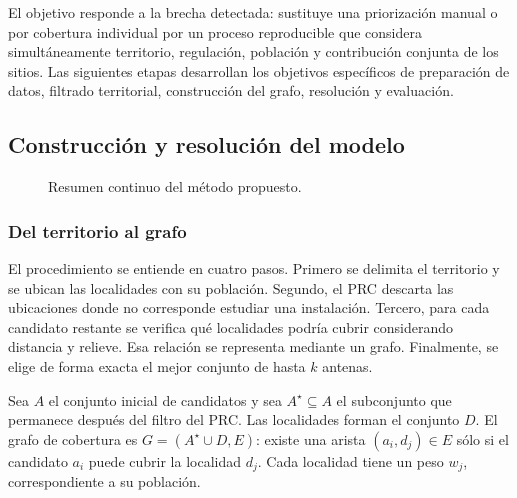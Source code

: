 \documentclass[12pt,letterpaper]{article}
\begin{document}
El objetivo responde a la brecha detectada: sustituye una priorización manual o por cobertura individual por un proceso reproducible que considera simultáneamente territorio, regulación, población y contribución conjunta de los sitios. Las siguientes etapas desarrollan los objetivos específicos de preparación de datos, filtrado territorial, construcción del grafo, resolución y evaluación.

\subsection{Construcción y resolución del modelo}
\begin{figure}[H]
\centering
{}
\caption{Resumen continuo del método propuesto.}
\label{fig:flujo}
\end{figure}

\subsubsection{Del territorio al grafo}
El procedimiento se entiende en cuatro pasos. Primero se delimita el territorio y se ubican las localidades con su población. Segundo, el PRC descarta las ubicaciones donde no corresponde estudiar una instalación. Tercero, para cada candidato restante se verifica qué localidades podría cubrir considerando distancia y relieve. Esa relación se representa mediante un grafo. Finalmente, se elige de forma exacta el mejor conjunto de hasta $k$ antenas.

Sea $A$ el conjunto inicial de candidatos y sea $A^\star\subseteq A$ el subconjunto que permanece después del filtro del PRC. Las localidades forman el conjunto $D$. El grafo de cobertura es $G=(A^\star\cup D,E)$: existe una arista $(a_i,d_j)\in E$ sólo si el candidato $a_i$ puede cubrir la localidad $d_j$. Cada localidad tiene un peso $w_j$, correspondiente a su población.
\end{document}
